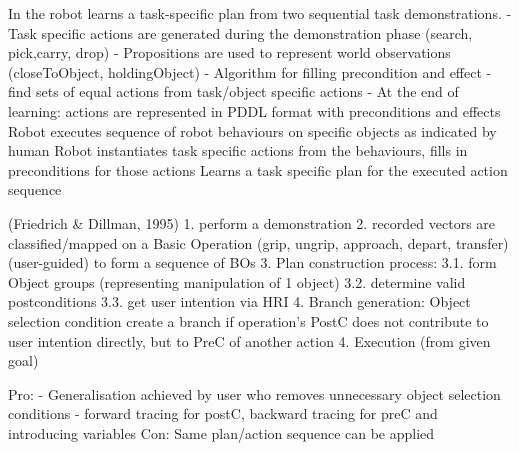 In \cite{veeraraghavan2008teaching} the robot learns a task-specific plan from two sequential task demonstrations. 
- Task specific actions are generated during the demonstration phase (search, pick,carry, drop)
- Propositions are used to represent world observations (closeToObject, holdingObject)
- Algorithm for filling precondition and effect - find sets of equal actions from task/object specific actions
- At the end of learning: actions are represented in PDDL format with preconditions and effects
Robot executes sequence of robot behaviours on specific objects as indicated by human
Robot instantiates task specific actions from the behaviours, fills in preconditions for those actions
Learns a task specific plan for the executed action sequence

(Friedrich \& Dillman, 1995)
1.
perform a demonstration
2.
recorded vectors are classified/mapped on a Basic Operation (grip, ungrip, approach, depart, transfer) (user-guided) to form a sequence of BOs
3.
Plan construction process: 
3.1.
form Object groups (representing manipulation of 1 object)
3.2.
determine valid postconditions
3.3.
get user intention via HRI
4.
Branch generation: Object selection condition
create a branch if operation's PostC does not contribute to user intention directly, but to PreC of another action
4.
Execution (from given goal)

Pro:
- Generalisation achieved by user who removes unnecessary object selection conditions
- forward tracing for postC, backward tracing for preC and introducing variables
Con: Same plan/action sequence can be applied



